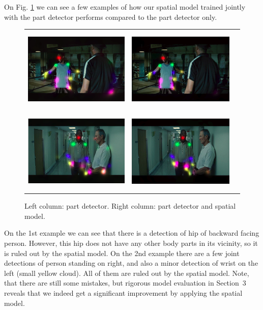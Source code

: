 \documentclass[a4paper,10pt]{article}
\begin{document}
	On Fig. \ref{example_pd_vs_sm} we can see a few examples of how our spatial model trained jointly with the part detector performs compared to the part detector only.
	\begin{figure}[H]
		\begin{tabular}{ccc}
			\includegraphics[height=4cm]{img/pd1.png} & \includegraphics[height=4cm]{img/sm1.png} \\
			\includegraphics[height=4cm]{img/pd2.png} & \includegraphics[height=4cm]{img/sm2.png} 
			\caption{Left column: part detector. Right column: part detector and spatial model.}
			\label{example_pd_vs_sm}
		\end{tabular}
	\end{figure}
	On the 1st example we can see that there is a detection of hip of backward facing person. However, this hip does not have any other body parts in its vicinity, so it is ruled out by the spatial model.
	On the 2nd example there are a few joint detections of person standing on right, and also a minor detection of wrist on the left (small yellow cloud). All of them are ruled out by the spatial model. Note, that there are still some mistakes, but rigorous model evaluation in Section~3 reveals that we indeed get a significant improvement by applying the spatial model.
		
\end{document}
